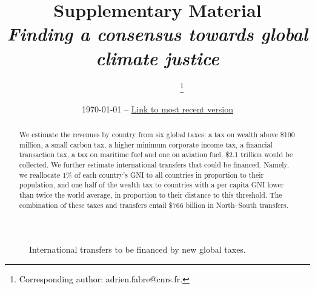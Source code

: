 \documentclass[12pt,english]{article}
\title{%
Supplementary Material \\ \textit{Finding a consensus towards global climate justice}
}
\author{\textcolor{white}{Adrien Fabre\footnote{\textcolor{black}{Corresponding author: adrien.fabre@cnrs.fr.}}}
}
\date{\today{} -- \href{https://github.com/bixiou/global_tax_attitudes/raw/main/paper/policy_brief_taxes.pdf}{Link to most recent version}}
\begin{document}
\maketitle


\begin{abstract}
  We estimate the revenues by country from six global taxes: a tax on wealth above \$100 million, a small carbon tax, a higher minimum corporate income tax, %
  a financial transaction tax, a tax on maritime fuel and one on aviation fuel. \$2.1 trillion would be collected. %
  We further estimate international transfers that could be financed.  %
  Namely, we reallocate 1\% of each country's GNI to all countries in proportion to their %
  population, and one half of the wealth tax to countries with a per capita GNI lower than twice the world average, in proportion to their distance to this threshold. The combination of these taxes and transfers entail \$766 billion in North--South transfers.  
\end{abstract}

\begin{figure}[h!] 
    \caption{International transfers to be financed by new global taxes.}\label{fig:gain_both_taxes}
\end{figure}
\end{document}
